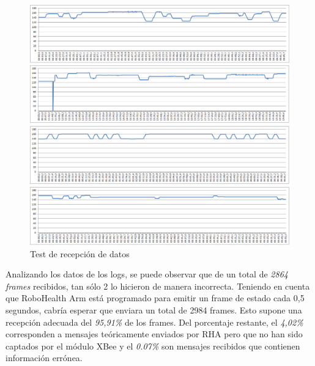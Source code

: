 \begin{figure}[tb]
  \centering
  \begin{minipage}[H]{1.1\textwidth}
    \includegraphics[width=\textwidth]{figuras/trec1.png}
  \end{minipage}
  \begin{minipage}[H]{1.1\textwidth}
    \includegraphics[width=\textwidth]{figuras/trec2.png}
  \end{minipage}
  \begin{minipage}[H]{1.1\textwidth}
    \includegraphics[width=\textwidth]{figuras/trec3.png}
  \end{minipage}
  \begin{minipage}[H]{1.1\textwidth}
    \includegraphics[width=\textwidth]{figuras/trec4.png}
  \end{minipage}
  \caption{Test de recepción de datos}\label{fig:trec}
\end{figure}

Analizando los datos de los logs, se puede observar que de un total de \textit{2864 frames} recibidos, tan sólo 2 lo hicieron de manera incorrecta. Teniendo en cuenta que RoboHealth Arm está programado para emitir un frame de estado cada 0,5 segundos, cabría esperar que enviara un total de 2984 frames. Esto supone una recepción adecuada del \textit{95,91\%} de los frames. Del porcentaje restante, el \textit{4,02\%} corresponden a mensajes teóricamente enviados por RHA pero que no han sido captados por el módulo XBee y el \textit{0.07\%} son mensajes recibidos que contienen información errónea.

